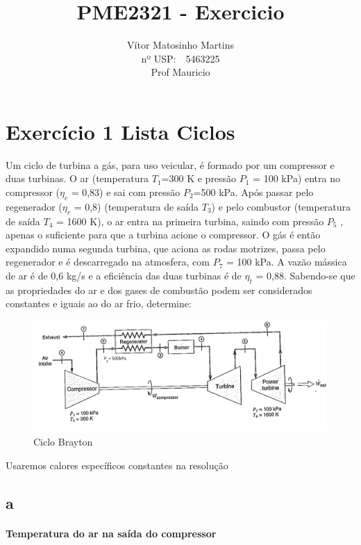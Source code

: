 \documentclass[a4paper, 12pt]{article}
\title{PME2321 - Exercicio}
\author{Vítor Matosinho Martins \\ 
nº USP:\ \ 5463225 \\
Prof Mauricio}
\begin{document}
\maketitle

\section{Exercício 1 Lista Ciclos}
Um ciclo de turbina a gás, para uso veicular, é formado por um compressor e duas
turbinas. O ar (temperatura $T_{1}$=300 K e pressão $P_{1}$ = 100 kPa) entra no compressor ($\eta _{c}$ = 0,83) e sai com pressão $P_{2}$=500 kPa. Após passar pelo regenerador ($\eta _{r}$ = 0,8) (temperatura de saída $T_{3}$) e pelo combustor (temperatura de saída $T_{4}$ = 1600 K), o ar entra na primeira turbina, saindo com pressão $P_{5}$ , apenas o suficiente para que a turbina acione o compressor. O gás é então expandido numa segunda turbina, que aciona as rodas motrizes, passa pelo regenerador e é descarregado na atmosfera, com $P_{7}$ = 100 kPa. A vazão mássica de ar é de 0,6 kg/s e a eficiência das duas turbinas é de $\eta _{t}$ = 0,88. Sabendo-se que as propriedades do ar e dos gases de combustão podem ser considerados constantes e iguais ao do ar frio, determine:

\begin{figure}[h]
\begin{center}
\includegraphics[scale=0.43,angle=-1.2]{./fig/1.png}
\caption{\label{fig:1}Ciclo Brayton} 
\end{center}
\end{figure}

\pagebreak

Usaremos calores específicos constantes na resolução

\subsection{a}
\paragraph*{Temperatura do ar na saída do compressor}
\end{document}
